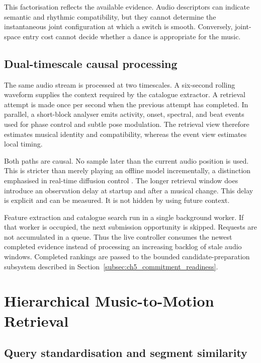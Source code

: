 This factorisation reflects the available evidence. Audio descriptors can
indicate semantic and rhythmic compatibility, but they cannot determine the
instantaneous joint configuration at which a switch is smooth. Conversely,
joint-space entry cost cannot decide whether a dance is appropriate for the
music.

\subsection{Dual-timescale causal processing}
\label{subsec:ch5_dual_timescale}

The same audio stream is processed at two timescales. A six-second rolling
waveform supplies the context required by the catalogue extractor. A retrieval
attempt is made once per second when the previous attempt has completed. In
parallel, a short-block analyser emits activity, onset, spectral, and beat
events used for phase control and subtle pose modulation. The retrieval view
therefore estimates musical identity and compatibility, whereas the event view
estimates local timing.

Both paths are causal. No sample later than the current audio position is used.
This is stricter than merely playing an offline model incrementally, a
distinction emphasised in real-time diffusion control
\cite{ji2026discoforcing}. The longer retrieval window does introduce an
observation delay at startup and after a musical change. This delay is explicit
and can be measured. It is not hidden by using future context.

Feature extraction and catalogue search run in a single background worker. If
that worker is occupied, the next submission opportunity is skipped. Requests
are not accumulated in a queue. Thus the live controller consumes the newest
completed evidence instead of processing an increasing backlog of stale audio
windows. Completed rankings are passed to the bounded candidate-preparation
subsystem described in Section~\ref{subsec:ch5_commitment_readiness}.

\section{Hierarchical Music-to-Motion Retrieval}
\label{sec:ch5_hierarchical_retrieval}

\subsection{Query standardisation and segment similarity}
\label{subsec:ch5_segment_similarity}

